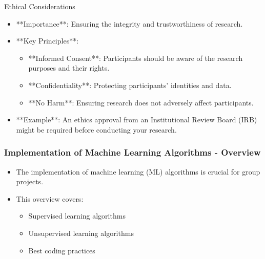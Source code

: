 \documentclass[aspectratio=169]{beamer}
\begin{document}
\begin{frame}[fragile]
    \begin{block}{Ethical Considerations}
        \begin{itemize}
            \item **Importance**: Ensuring the integrity and trustworthiness of research.
            \item **Key Principles**:
                \begin{itemize}
                    \item **Informed Consent**: Participants should be aware of the research purposes and their rights.
                    \item **Confidentiality**: Protecting participants' identities and data.
                    \item **No Harm**: Ensuring research does not adversely affect participants.
                \end{itemize}
            \item **Example**: An ethics approval from an Institutional Review Board (IRB) might be required before conducting your research.
        \end{itemize}
    \end{block}
\end{frame}

\begin{frame}[fragile]
    \frametitle{Implementation of Machine Learning Algorithms - Overview}
    \begin{itemize}
        \item The implementation of machine learning (ML) algorithms is crucial for group projects.
        \item This overview covers:
        \begin{itemize}
            \item Supervised learning algorithms
            \item Unsupervised learning algorithms
            \item Best coding practices
        \end{itemize}
    \end{itemize}
\end{frame}
\end{document}

